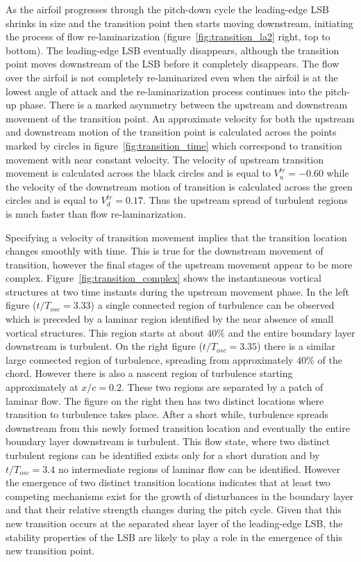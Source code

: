 As the airfoil progresses through the pitch-down cycle the leading-edge LSB shrinks in size and the transition point then starts moving downstream, initiating the process of flow re-laminarization (figure~\ref{fig:transition_la2} right, top to bottom). The leading-edge LSB eventually disappears, although the transition point moves downstream of the LSB before it completely disappears. The flow over the airfoil is not completely re-laminarized even when the airfoil is at the lowest angle of attack and the re-laminarization process continues into the pitch-up phase. There is a marked asymmetry between the upstream and downstream movement of the transition point. An approximate velocity for both the upstream and downstream motion of the transition point is calculated across the points marked by circles in figure~\ref{fig:transition_time} which correspond to transition movement with near constant velocity. The velocity of upstream transition movement is calculated across the black circles and is equal to $V^{tr}_{u}=-0.60$ while the velocity of the downstream motion of transition is calculated across the green circles and is equal to $V^{tr}_{d}=0.17$. Thus the upstream spread of turbulent regions is much faster than flow re-laminarization. %

Specifying a velocity of transition movement implies that the transition location changes smoothly with time. This is true for the downstream movement of transition, however the final stages of the upstream movement appear to be more complex. Figure~\ref{fig:transition_complex} shows the instantaneous vortical structures at two time instants during the upstream movement phase. In the left figure ($t/T_{osc}=3.33$) a single connected region of turbulence can be observed which is preceded by a laminar region identified by the near absence of small vortical structures. This region starts at about $40\%$ and the entire boundary layer downstream is turbulent. On the right figure ($t/T_{osc}=3.35$) there is a similar large connected region of turbulence, spreading from approximately $40\%$ of the chord. However there is also a nascent region of turbulence starting approximately at $x/c=0.2$. These two regions are separated by a patch of laminar flow. The figure on the right then has two distinct locations where transition to turbulence takes place. After a short while, turbulence spreads downstream from this newly formed transition location and eventually the entire boundary layer downstream is turbulent. This flow state, where two distinct turbulent regions can be identified exists only for a short duration and by $t/T_{osc}=3.4$ no intermediate regions of laminar flow can be identified. However the emergence of two distinct transition locations indicates that at least two competing mechanisms exist for the growth of disturbances in the boundary layer and that their relative strength changes during the pitch cycle. Given that this new transition occurs at the separated shear layer of the leading-edge LSB, the stability properties of the LSB are likely to play a role in the emergence of this new transition point. 

